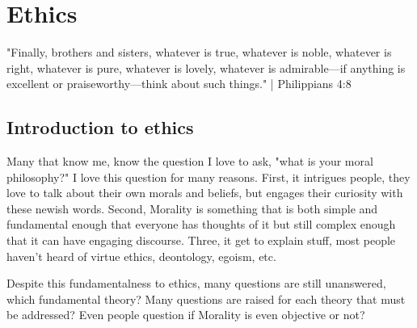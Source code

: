 \chapter{Ethics}
"Finally, brothers and sisters, whatever is true, whatever is noble, whatever is right, whatever is pure, whatever is lovely, whatever is admirable—if anything is excellent or praiseworthy—think about such things." | Philippians 4:8

\section{Introduction to ethics}
\par Many that know me, know the question I love to ask, "what is your moral philosophy?" I love this question for many reasons. First, it intrigues people, they love to talk about their own morals and beliefs, but engages their curiosity with these newish words. Second, Morality is something that is both simple and fundamental enough that everyone has thoughts of it but still complex enough that it can have engaging discourse. Three, it get to explain stuff, most people haven't heard of virtue ethics, deontology, egoism, etc.

\par Despite this fundamentalness to ethics, many questions are still unanswered, which fundamental theory? Many questions are raised for each theory that must be addressed? Even people question if Morality is even objective or not?
